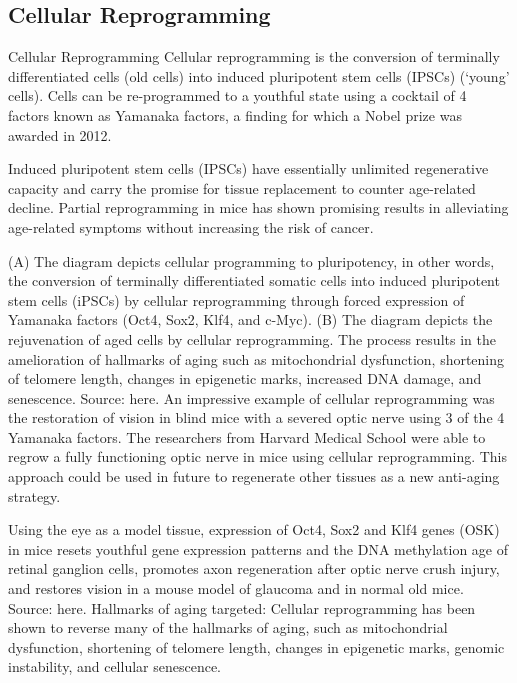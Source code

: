 \subsection{Cellular Reprogramming}

\begin{frame}[c]{Cellular Reprogramming}
    Cellular reprogramming is the conversion of terminally differentiated cells (old cells) into induced pluripotent stem cells (IPSCs) (‘young’ cells). Cells can be re-programmed to a youthful state using a cocktail of 4 factors known as Yamanaka factors, a finding for which a Nobel prize was awarded in 2012.

Induced pluripotent stem cells (IPSCs) have essentially unlimited regenerative capacity and carry the promise for tissue replacement to counter age-related decline. Partial reprogramming in mice has shown promising results in alleviating age-related symptoms without increasing the risk of cancer.


(A) The diagram depicts cellular programming to pluripotency, in other words, the conversion of terminally differentiated somatic cells into induced pluripotent stem cells (iPSCs) by cellular reprogramming through forced expression of Yamanaka factors (Oct4, Sox2, Klf4, and c-Myc). (B) The diagram depicts the rejuvenation of aged cells by cellular reprogramming. The process results in the amelioration of hallmarks of aging such as mitochondrial dysfunction, shortening of telomere length, changes in epigenetic marks, increased DNA damage, and senescence. Source: here.
An impressive example of cellular reprogramming was the restoration of vision in blind mice with a severed optic nerve using 3 of the 4 Yamanaka factors. The researchers from Harvard Medical School were able to regrow a fully functioning optic nerve in mice using cellular reprogramming. This approach could be used in future to regenerate other tissues as a new anti-aging strategy.


Using the eye as a model tissue, expression of Oct4, Sox2 and Klf4 genes (OSK) in mice resets youthful gene expression patterns and the DNA methylation age of retinal ganglion cells, promotes axon regeneration after optic nerve crush injury, and restores vision in a mouse model of glaucoma and in normal old mice. Source: here.
Hallmarks of aging targeted: Cellular reprogramming has been shown to reverse many of the hallmarks of aging, such as mitochondrial dysfunction, shortening of telomere length, changes in epigenetic marks, genomic instability, and cellular senescence.
\end{frame}


